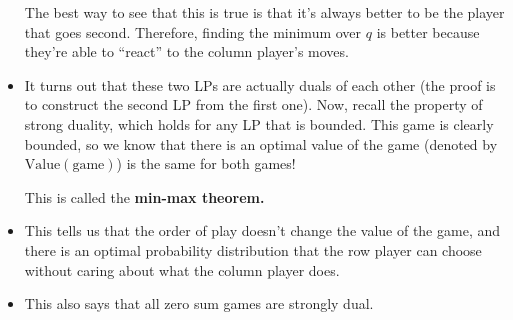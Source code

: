 \begin{itemize}


		The best way to see that this is true is that it's always better to be the player that 
		goes second. Therefore, finding the minimum over \(q\) is better because they're able to ``react'' to 
		the column player's moves.
	\item It turns out that these two LPs are actually duals of each other (the proof is to construct 
		the second LP from the first one). Now, recall the property of strong duality, which holds for any LP
		that is bounded. This game is clearly bounded, so we know that there is an optimal value of the game 
		(denoted by $\mathrm{Value}(\text{game})$) is the same for both games!  

		This is called the \textbf{min-max theorem.}
	\item This tells us that the order of play doesn't change the value of the game, and there is an optimal 
		probability distribution that the row player can choose without caring about what the column player 
		does. 
		
	\item This also says that all zero sum games are strongly dual.
\end{itemize}
